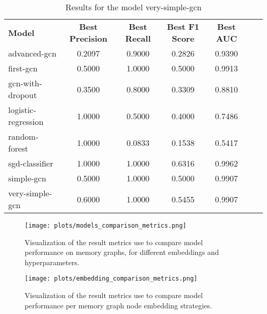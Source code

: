 \begin{table}[H]
    \centering
    \caption{Results for the model very-simple-gcn}
    \begin{tabular}{lcccccc}
      \textbf{Model}  & \textbf{Best Precision} & \textbf{Best Recall} & \textbf{Best F1 Score} & \textbf{Best AUC} \\
        advanced-gcn & 0.2097 & 0.9000 & 0.2826 & 0.9390 \\
        first-gcn & 0.5000 & 1.0000 & 0.5000 & 0.9913 \\
        gcn-with-dropout & 0.3500 & 0.8000 & 0.3309 & 0.8810 \\
        logistic-regression & 1.0000 & 0.5000 & 0.4000 & 0.7486 \\
        random-forest & 1.0000 & 0.0833 & 0.1538 & 0.5417 \\
        sgd-classifier & 1.0000 & 1.0000 & 0.6316 & 0.9962 \\
        simple-gcn & 0.5000 & 1.0000 & 0.5000 & 0.9907 \\
        very-simple-gcn & 0.6000 & 1.0000 & 0.5455 & 0.9907 \\
    \end{tabular}
\end{table}

\begin{figure}[H]\label{results:compare:models:full}
    \centering
    \texttt{[image: plots/models\_comparison\_metrics.png]}
    \caption{Visualization of the result metrics use to compare model performance on memory graphs, for different embeddings and hyperparameters.}
\end{figure}

\begin{figure}[H]\label{results:compare:embeddings:full}
    \centering
    \texttt{[image: plots/embedding\_comparison\_metrics.png]}
    \caption{Visualization of the result metrics use to compare model performance per memory graph node embedding strategies.}
\end{figure}


